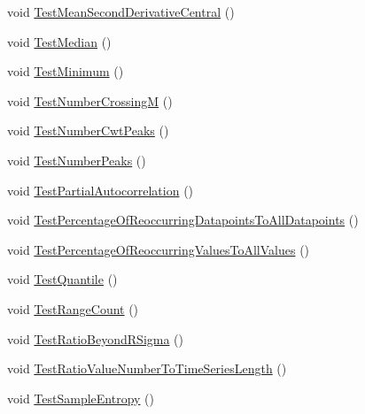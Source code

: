 \begin{DoxyCompactItemize}
void \mbox{\hyperlink{classkhiva_1_1features_1_1tests_1_1_features_tests_ab36d220ce32df13db8a0e6c5757898dc}{Test\+Mean\+Second\+Derivative\+Central}} ()
\item 
void \mbox{\hyperlink{classkhiva_1_1features_1_1tests_1_1_features_tests_a7087a7fc0600d5f1a27eea19babf4327}{Test\+Median}} ()
\item 
void \mbox{\hyperlink{classkhiva_1_1features_1_1tests_1_1_features_tests_ab8965ec072050d1963ecc4fa9b7417bb}{Test\+Minimum}} ()
\item 
void \mbox{\hyperlink{classkhiva_1_1features_1_1tests_1_1_features_tests_ae94267f19b1e2cebf170bac87a55318c}{Test\+Number\+CrossingM}} ()
\item 
void \mbox{\hyperlink{classkhiva_1_1features_1_1tests_1_1_features_tests_acaad5459398b8edd341eb6457880db73}{Test\+Number\+Cwt\+Peaks}} ()
\item 
void \mbox{\hyperlink{classkhiva_1_1features_1_1tests_1_1_features_tests_afbb4170eedb202447f9f2f72a55339e7}{Test\+Number\+Peaks}} ()
\item 
void \mbox{\hyperlink{classkhiva_1_1features_1_1tests_1_1_features_tests_a054cd00054d39a03e27836481c34688c}{Test\+Partial\+Autocorrelation}} ()
\item 
void \mbox{\hyperlink{classkhiva_1_1features_1_1tests_1_1_features_tests_a1250a73119f4959d6b0a1e43ad079b74}{Test\+Percentage\+Of\+Reoccurring\+Datapoints\+To\+All\+Datapoints}} ()
\item 
void \mbox{\hyperlink{classkhiva_1_1features_1_1tests_1_1_features_tests_af52faddee2d984d9916afab95daeeb3d}{Test\+Percentage\+Of\+Reoccurring\+Values\+To\+All\+Values}} ()
\item 
void \mbox{\hyperlink{classkhiva_1_1features_1_1tests_1_1_features_tests_a1bb2e00bb8712854f785a00542a38f4d}{Test\+Quantile}} ()
\item 
void \mbox{\hyperlink{classkhiva_1_1features_1_1tests_1_1_features_tests_a29a0208149b3a90c39ab27542d302c9c}{Test\+Range\+Count}} ()
\item 
void \mbox{\hyperlink{classkhiva_1_1features_1_1tests_1_1_features_tests_a32271f1d15b79750f9ea8d3e7fb46a9e}{Test\+Ratio\+Beyond\+R\+Sigma}} ()
\item 
void \mbox{\hyperlink{classkhiva_1_1features_1_1tests_1_1_features_tests_ac7113dda7c166daa49362bf3a0d2e507}{Test\+Ratio\+Value\+Number\+To\+Time\+Series\+Length}} ()
\item 
void \mbox{\hyperlink{classkhiva_1_1features_1_1tests_1_1_features_tests_a2fae2e7beee3ddce3557a673ca8335cf}{Test\+Sample\+Entropy}} ()

\end{DoxyCompactItemize}
